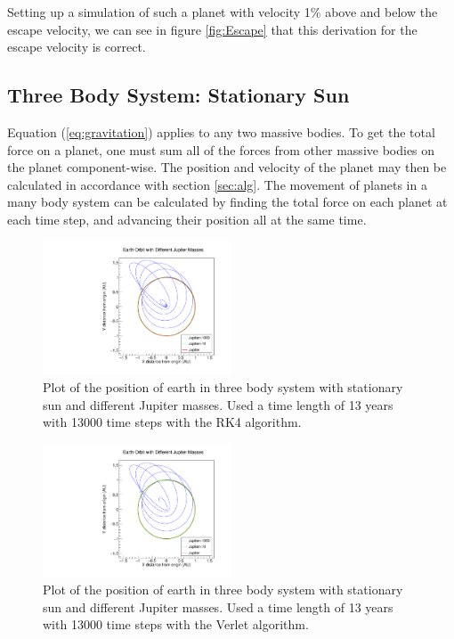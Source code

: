 \documentclass[a4paper,12pt]{report}
\begin{document}
 Setting up a simulation of such a planet with velocity 1\% above and below the escape velocity, we can see in figure \ref{fig:Escape} that this derivation for the escape velocity is correct.
 
\subsection{Three Body System: Stationary Sun}\label{ssec:3bsss}
Equation (\ref{eq:gravitation}) applies to any two massive bodies. To get the total force on a planet, one must sum all of the forces from other massive bodies on the planet component-wise. The position and velocity of the planet may then be calculated in accordance with section \ref{sec:alg}. The movement of planets in a many body system can be calculated by finding the total force on each planet at each time step, and advancing their position all at the same time.

\begin{figure}
 \centering
   \includegraphics[width=0.5\textwidth]{ESJFRK4_Earths.pdf}
  \caption{Plot of the position of earth in three body system with stationary sun and different Jupiter masses. Used a time length of 13 years with 13000 time steps with the RK4 algorithm.}
  \label{fig:ESJFRK4_Earths}
 \end{figure}

 \begin{figure}
 \centering
   \includegraphics[width=0.5\textwidth]{ESJFVerlet_Earths.pdf}
  \caption{Plot of the position of earth in three body system with stationary sun and different Jupiter masses. Used a time length of 13 years with 13000 time steps with the Verlet algorithm.}
  \label{fig:ESJFVerlet_Earths}
 \end{figure}
\end{document}
